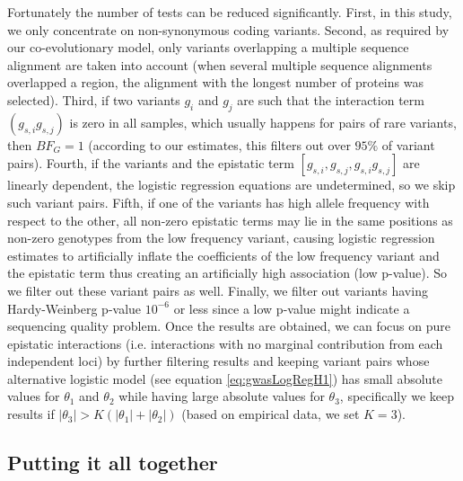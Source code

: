 Fortunately the number of tests can be reduced significantly. 
First, in this study, we only concentrate on non-synonymous coding variants. 
Second, as required by our co-evolutionary model, only variants overlapping a multiple sequence alignment are taken into account (when several multiple sequence alignments overlapped a region, the alignment with the longest number of proteins was selected).
Third, if two variants $g_i$ and $g_j$ are such that the interaction term $(g_{s,i} g_{s,j})$ is zero in all samples, which usually happens for pairs of rare variants, then $BF_G = 1$ (according to our estimates, this filters out over $95 \%$ of variant pairs). 
Fourth, if the variants and the epistatic term $[g_{s,i}, g_{s,j}, g_{s,i} g_{s,j}]$ are linearly dependent, the logistic regression equations are undetermined, so we skip such variant pairs. 
Fifth, if one of the variants has high allele frequency with respect to the other, all non-zero epistatic terms may lie in the same positions as non-zero genotypes from the low frequency variant, causing logistic regression estimates to artificially inflate the coefficients of the low frequency variant and the epistatic term thus creating an artificially high association (low p-value). 
So we filter out these variant pairs as well. 
Finally, we filter out variants having Hardy-Weinberg p-value $10^{-6}$ or less since a low p-value might indicate a sequencing quality problem.
Once the results are obtained, we can focus on pure epistatic interactions (i.e. interactions with no marginal contribution from each independent loci) by further filtering results and keeping variant pairs whose alternative logistic model (see equation \ref{eq:gwasLogRegH1}) has small absolute values for $\theta_1$ and $\theta_2$ while having large absolute values for $\theta_3$, specifically we keep results if $|\theta_3| > K ( |\theta_1| + |\theta_2| )$ (based on empirical data, we set $K=3$). 

\subsection{Putting it all together}

